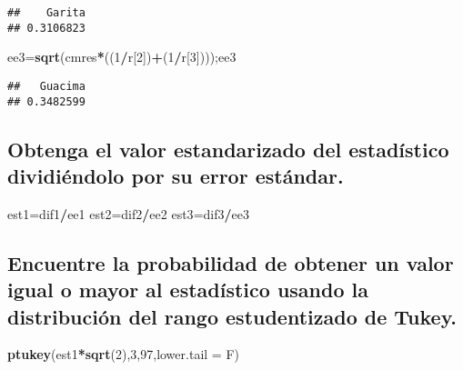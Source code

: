 \documentclass[
]{article}
\newenvironment{Shaded}{\begin{snugshade}}{\end{snugshade}}
\newcommand{\AttributeTok}[1]{\textcolor[rgb]{0.13,0.29,0.53}{#1}}
\newcommand{\DecValTok}[1]{\textcolor[rgb]{0.00,0.00,0.81}{#1}}
\newcommand{\FunctionTok}[1]{\textcolor[rgb]{0.13,0.29,0.53}{\textbf{#1}}}
\newcommand{\NormalTok}[1]{#1}
\newcommand{\OtherTok}[1]{\textcolor[rgb]{0.56,0.35,0.01}{#1}}
\newcommand{\SpecialCharTok}[1]{\textcolor[rgb]{0.81,0.36,0.00}{\textbf{#1}}}
\begin{document}
\begin{verbatim}
##    Garita 
## 0.3106823
\end{verbatim}

\begin{Shaded}
\begin{Highlighting}[]
\NormalTok{ee3}\OtherTok{=}\FunctionTok{sqrt}\NormalTok{(cmres}\SpecialCharTok{*}\NormalTok{((}\DecValTok{1}\SpecialCharTok{/}\NormalTok{r[}\DecValTok{2}\NormalTok{])}\SpecialCharTok{+}\NormalTok{(}\DecValTok{1}\SpecialCharTok{/}\NormalTok{r[}\DecValTok{3}\NormalTok{])));ee3}
\end{Highlighting}
\end{Shaded}

\begin{verbatim}
##   Guacima 
## 0.3482599
\end{verbatim}

\hypertarget{obtenga-el-valor-estandarizado-del-estaduxedstico-dividiuxe9ndolo-por-su-error-estuxe1ndar.}{%
\subsection{Obtenga el valor estandarizado del estadístico dividiéndolo
por su error
estándar.}\label{obtenga-el-valor-estandarizado-del-estaduxedstico-dividiuxe9ndolo-por-su-error-estuxe1ndar.}}

\begin{Shaded}
\begin{Highlighting}[]
\NormalTok{est1}\OtherTok{=}\NormalTok{dif1}\SpecialCharTok{/}\NormalTok{ee1}
\NormalTok{est2}\OtherTok{=}\NormalTok{dif2}\SpecialCharTok{/}\NormalTok{ee2}
\NormalTok{est3}\OtherTok{=}\NormalTok{dif3}\SpecialCharTok{/}\NormalTok{ee3}
\end{Highlighting}
\end{Shaded}

\hypertarget{encuentre-la-probabilidad-de-obtener-un-valor-igual-o-mayor-al-estaduxedstico-usando-la-distribuciuxf3n-del-rango-estudentizado-de-tukey.}{%
\subsection{Encuentre la probabilidad de obtener un valor igual o mayor
al estadístico usando la distribución del rango estudentizado de
Tukey.}\label{encuentre-la-probabilidad-de-obtener-un-valor-igual-o-mayor-al-estaduxedstico-usando-la-distribuciuxf3n-del-rango-estudentizado-de-tukey.}}

\begin{Shaded}
\begin{Highlighting}[]
\FunctionTok{ptukey}\NormalTok{(est1}\SpecialCharTok{*}\FunctionTok{sqrt}\NormalTok{(}\DecValTok{2}\NormalTok{),}\DecValTok{3}\NormalTok{,}\DecValTok{97}\NormalTok{,}\AttributeTok{lower.tail =}\NormalTok{ F)}
\end{Highlighting}
\end{Shaded}
\end{document}
